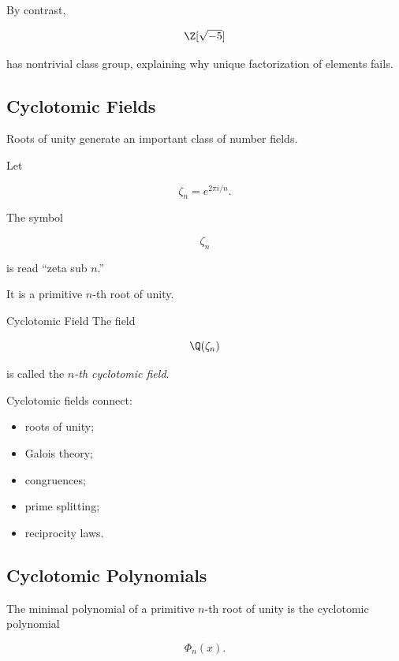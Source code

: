 By contrast,

\[ \Z[\sqrt{-5}] \]

has nontrivial class group, explaining why unique factorization of elements
fails.

\subsection{Cyclotomic Fields}
\label{subsec:cyclotomic-fields-introduction}

Roots of unity generate an important class of number fields.

Let

\[ \zeta_n=e^{2\pi i/n}. \]

The symbol

\[ \zeta_n \]

is read ``zeta sub \(n\).''

It is a primitive \(n\)-th root of unity.

\begin{definitionbox}{Cyclotomic Field}
The field

\[ \Q(\zeta_n) \]

is called the \emph{\(n\)-th cyclotomic field}.
\end{definitionbox}

Cyclotomic fields connect:

\begin{itemize}
    \item roots of unity;
    \item Galois theory;
    \item congruences;
    \item prime splitting;
    \item reciprocity laws.
\end{itemize}

\subsection{Cyclotomic Polynomials}
\label{subsec:cyclotomic-polynomials-number-theory}

The minimal polynomial of a primitive \(n\)-th root of unity is the
cyclotomic polynomial

\[ \Phi_n(x). \]

